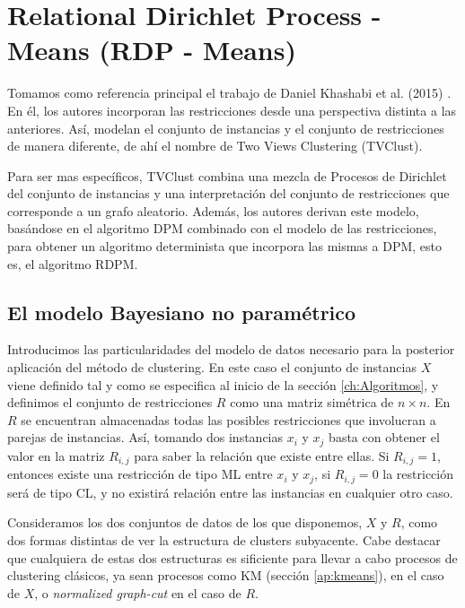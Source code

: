 \clearpage




\section{Relational Dirichlet Process - Means (RDP - Means)} \label{rdpmYtvc}

Tomamos como referencia principal el trabajo de Daniel Khashabi et al. (2015) \cite{RDPM:2015}. En él, los autores incorporan las restricciones desde una perspectiva distinta a las anteriores. Así, modelan el conjunto de instancias y el conjunto de restricciones de manera diferente, de ahí el nombre de Two Views Clustering (TVClust).

Para ser mas específicos, TVClust combina una mezcla de Procesos de Dirichlet del conjunto de instancias y una interpretación del conjunto de restricciones que corresponde a un grafo aleatorio. Además, los autores derivan este modelo, basándose en el algoritmo \acf{DPM} \cite{DPM:2012} combinado con el modelo de las restricciones, para obtener un algoritmo determinista que incorpora las mismas a \acs{DPM}, esto es, el algoritmo \acf{RDPM}.

\subsection{El modelo Bayesiano no paramétrico}

Introducimos las particularidades del modelo de datos necesario para la posterior aplicación del método de clustering. En este caso el conjunto de instancias $X$ viene definido tal y como se especifica al inicio de la sección \ref{ch:Algoritmos}, y definimos el conjunto de restricciones $R$ como una matriz simétrica de $n \times n$. En $R$ se encuentran almacenadas todas las posibles restricciones que involucran a parejas de instancias. Así, tomando dos instancias $x_i$ y $x_j$ basta con obtener el valor en la matriz $R_{i,j}$ para saber la relación que existe entre ellas. Si $R_{i,j} = 1$, entonces existe una restricción de tipo \acf{ML} entre $x_i$ y $x_j$, si $R_{i,j} = 0$ la restricción será de tipo \acf{CL}, y no existirá relación entre las instancias en cualquier otro caso.

Consideramos los dos conjuntos de datos de los que disponemos, $X$ y $R$, como dos formas distintas de ver la estructura de clusters subyacente. Cabe destacar que cualquiera de estas dos estructuras es sificiente para llevar a cabo procesos de clustering clásicos, ya sean procesos como \acf{KM} (sección \ref{ap:kmeans}), en el caso de $X$, o \textit{normalized graph-cut} en el caso de $R$.

